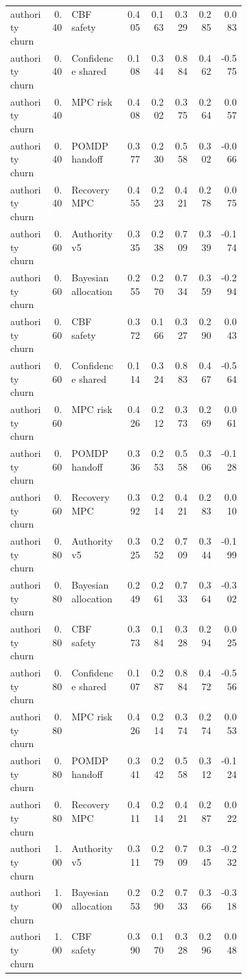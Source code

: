 \documentclass{article}
\begin{document}
\begin{center}
\begin{longtable}{p{0.17\linewidth}rp{0.23\linewidth}rrrrr}
authority churn & 0.40 & CBF safety & 0.405 & 0.163 & 0.329 & 0.285 & 0.083\\
authority churn & 0.40 & Confidence shared & 0.108 & 0.344 & 0.884 & 0.462 & -0.575\\
authority churn & 0.40 & MPC risk & 0.408 & 0.202 & 0.375 & 0.264 & 0.057\\
authority churn & 0.40 & POMDP handoff & 0.377 & 0.230 & 0.558 & 0.302 & -0.066\\
authority churn & 0.40 & Recovery MPC & 0.455 & 0.223 & 0.421 & 0.278 & 0.075\\
authority churn & 0.60 & Authority v5 & 0.335 & 0.238 & 0.709 & 0.339 & -0.174\\
authority churn & 0.60 & Bayesian allocation & 0.255 & 0.270 & 0.734 & 0.359 & -0.294\\
authority churn & 0.60 & CBF safety & 0.372 & 0.166 & 0.327 & 0.290 & 0.043\\
authority churn & 0.60 & Confidence shared & 0.114 & 0.324 & 0.883 & 0.467 & -0.564\\
authority churn & 0.60 & MPC risk & 0.426 & 0.212 & 0.373 & 0.269 & 0.061\\
authority churn & 0.60 & POMDP handoff & 0.336 & 0.253 & 0.558 & 0.306 & -0.128\\
authority churn & 0.60 & Recovery MPC & 0.392 & 0.214 & 0.421 & 0.283 & 0.010\\
authority churn & 0.80 & Authority v5 & 0.325 & 0.252 & 0.709 & 0.344 & -0.199\\
authority churn & 0.80 & Bayesian allocation & 0.249 & 0.261 & 0.733 & 0.364 & -0.302\\
authority churn & 0.80 & CBF safety & 0.373 & 0.184 & 0.328 & 0.294 & 0.025\\
authority churn & 0.80 & Confidence shared & 0.107 & 0.287 & 0.884 & 0.472 & -0.556\\
authority churn & 0.80 & MPC risk & 0.426 & 0.214 & 0.374 & 0.274 & 0.053\\
authority churn & 0.80 & POMDP handoff & 0.341 & 0.242 & 0.558 & 0.312 & -0.124\\
authority churn & 0.80 & Recovery MPC & 0.411 & 0.214 & 0.421 & 0.287 & 0.022\\
authority churn & 1.00 & Authority v5 & 0.311 & 0.279 & 0.709 & 0.345 & -0.232\\
authority churn & 1.00 & Bayesian allocation & 0.253 & 0.290 & 0.733 & 0.366 & -0.318\\
authority churn & 1.00 & CBF safety & 0.390 & 0.170 & 0.328 & 0.296 & 0.048\\

\end{longtable}
\end{center}
\end{document}
